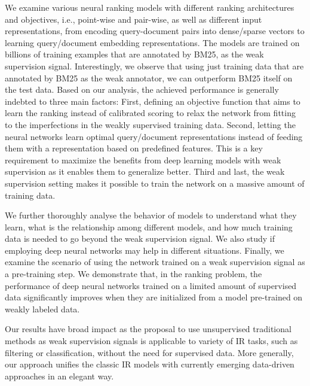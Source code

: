 \documentclass[sigconf]{acmart}
\def\:{\hskip0pt} %
\begin{document}
We examine various neural ranking models with different ranking architectures and objectives, i.e., point-wise and pair-wise, as well as different input representations, from encoding query-document pairs into dense\:/\:sparse vectors to learning query\:/\:document embedding representations. 
The models are trained on billions of training examples that are annotated by BM25, as the weak supervision signal.
Interestingly, we observe that using just training data that are annotated by BM25 as the weak annotator, we can outperform BM25 itself on the test data.
%
Based on our analysis, the achieved performance is generally indebted to three main factors: 
%
First, defining an objective function that aims to learn the ranking instead of calibrated scoring to relax the network from fitting to the imperfections in the weakly supervised training data.
%
Second, letting the neural networks learn optimal query/document representations instead of feeding them with a representation based on predefined features. This is a key requirement to maximize the benefits from deep learning models with weak supervision as it enables them to generalize better.
%
Third and last, the weak supervision setting makes it possible to train the network on a massive amount of training data.
%

We further thoroughly analyse the behavior of models to understand what they learn, what is the relationship among different models, and how much training data is needed to go beyond the weak supervision signal. We also study if employing deep neural networks may help in different situations. 
%
Finally, we examine the scenario of using the network trained on a weak supervision signal as a pre-training step. We demonstrate that, in the ranking problem, the performance of deep neural networks trained on a limited amount of supervised data significantly improves when they are initialized from a model pre-trained on weakly labeled data.

Our results have broad impact as the proposal to use unsupervised traditional methods as weak supervision signals is applicable to variety of IR tasks, such as filtering or classification, without the need for supervised data. 
More generally, our approach unifies the classic IR models with currently emerging data-driven approaches in an elegant way.
%
\end{document}
